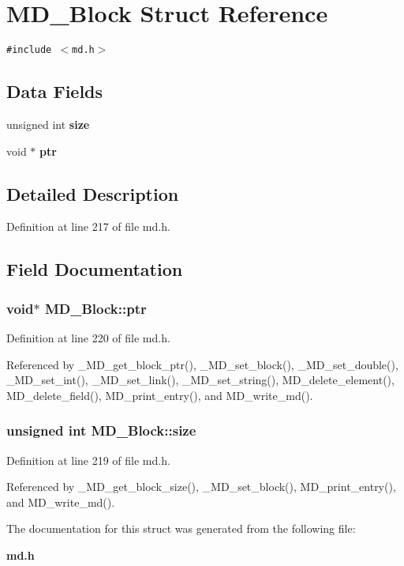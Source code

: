 \section{MD\_\-Block Struct Reference}
\label{structMD__Block}
{\tt \#include $<$md.h$>$}

\subsection*{Data Fields}
\begin{CompactItemize}
\item 
unsigned int \bf{size}
\item 
void $\ast$ \bf{ptr}
\end{CompactItemize}


\subsection{Detailed Description}




Definition at line 217 of file md.h.

\subsection{Field Documentation}
\subsubsection{\setlength{\rightskip}{0pt plus 5cm}void$\ast$ \bf{MD\_\-Block::ptr}}\label{structMD__Block_7054e2119f4cfecca3d47a4f8a473c90}




Definition at line 220 of file md.h.

Referenced by \_\-MD\_\-get\_\-block\_\-ptr(), \_\-MD\_\-set\_\-block(), \_\-MD\_\-set\_\-double(), \_\-MD\_\-set\_\-int(), \_\-MD\_\-set\_\-link(), \_\-MD\_\-set\_\-string(), MD\_\-delete\_\-element(), MD\_\-delete\_\-field(), MD\_\-print\_\-entry(), and MD\_\-write\_\-md().
\subsubsection{\setlength{\rightskip}{0pt plus 5cm}unsigned int \bf{MD\_\-Block::size}}\label{structMD__Block_87b1b357c4da7f2326a9f8ed946bc80b}




Definition at line 219 of file md.h.

Referenced by \_\-MD\_\-get\_\-block\_\-size(), \_\-MD\_\-set\_\-block(), MD\_\-print\_\-entry(), and MD\_\-write\_\-md().

The documentation for this struct was generated from the following file:\begin{CompactItemize}
\item 
\bf{md.h}\end{CompactItemize}
